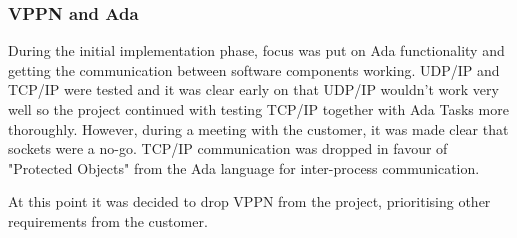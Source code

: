 \subsubsection{VPPN and Ada}
During the initial implementation phase, focus was put on Ada functionality and
getting the communication between software components working. UDP/IP and TCP/IP
were tested and it was clear early on that UDP/IP wouldn't work very well so
the project continued with testing TCP/IP together with Ada Tasks more
thoroughly. However, during a meeting with the customer, it was made clear that sockets were a no-go. TCP/IP communication
was dropped in favour of "Protected Objects" from the Ada language for inter-process communication.

At this point it was decided to drop VPPN from the project, prioritising other
requirements from the customer.

%
